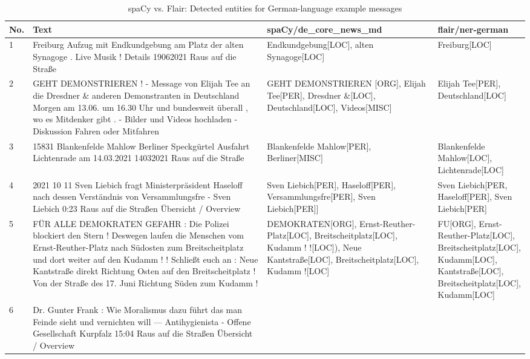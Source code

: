 \begin{table}[htp]
\caption{spaCy vs. Flair: Detected entities for German-language example messages}
\label{tab:detect_ents_de}
\centering
\begin{adjustbox}{max width=\textwidth}
\begin{tabular}{|p{0.04\linewidth}|p{0.55\linewidth}|p{0.36\linewidth}|p{0.3\linewidth}|}
\hline
\textbf{No.} & \textbf{Text} & \textbf{spaCy/de\_core\_news\_md} & \textbf{flair/ner-german} \\
\hline 
1 
& Freiburg Aufzug mit Endkundgebung am Platz der alten
Synagoge . Live Musik ! Details 19062021 Raus auf die Straße 
& Endkundgebung[LOC], alten Synagoge[LOC]
& Freiburg[LOC] \\
\hline
2 
& GEHT DEMONSTRIEREN ! - Message von Elijah Tee an die Dresdner \& anderen Demonstranten in Deutschland Morgen am 13.06. um 16.30 Uhr und bundesweit überall , wo es Mitdenker gibt . - Bilder und Videos hochladen - Diskussion Fahren oder Mitfahren
& GEHT DEMONSTRIEREN [ORG], Elijah Tee[PER], Dresdner \&[LOC], Deutschland[LOC], Videos[MISC]
& Elijah Tee[PER], Deutschland[LOC] \\ 
\hline
3 
& 15831 Blankenfelde Mahlow Berliner Speckgürtel Ausfahrt Lichtenrade am 14.03.2021 14032021 Raus auf die Straße
& Blankenfelde Mahlow[PER], Berliner[MISC]
& Blankenfelde Mahlow[LOC], Lichtenrade[LOC]\\ 
\hline
4 
& 2021 10 11 Sven Liebich fragt Ministerpräsident Haseloff nach dessen Verständnis 
von Versammlungsfre - Sven Liebich 0:23 Raus auf die Straßen  \"Ubersicht / Overview 
& Sven Liebich[PER], Haseloff[PER], Versammlungsfre[PER], Sven Liebich[PER]] 
& Sven Liebich[PER, Haseloff[PER], Sven Liebich[PER]\\ 
\hline
5 
& F\"UR ALLE DEMOKRATEN   GEFAHR : Die Polizei blockiert den Stern !   Deswegen laufen die Menschen vom Ernst-Reuther-Platz nach Südosten zum Breitscheitplatz und dort weiter auf den Kudamm ! ! Schließt euch an : Neue Kantstraße direkt Richtung Osten auf den Breitscheitplatz ! Von der Straße des 17. Juni Richtung Süden zum Kudamm ! 
& DEMOKRATEN[ORG], Ernst-Reuther-Platz[LOC], Breitscheitplatz[LOC], Kudamm ! ![LOC]), Neue Kantstraße[LOC], Breitscheitplatz[LOC], Kudamm ![LOC]
& FU[ORG], Ernst-Reuther-Platz[LOC], Breitscheitplatz[LOC], Kudamm[LOC], Kantstraße[LOC], Breitscheitplatz[LOC], Kudamm[LOC]\\ 
\hline
6 
& Dr. Gunter Frank : Wie Moralismus dazu führt das man Feinde sieht und vernichten will — Antihygienista - Offene Gesellschaft Kurpfalz 15:04 Raus auf die Straßen   \"Ubersicht / Overview 

\end{tabular}
\end{adjustbox}
\end{table}
